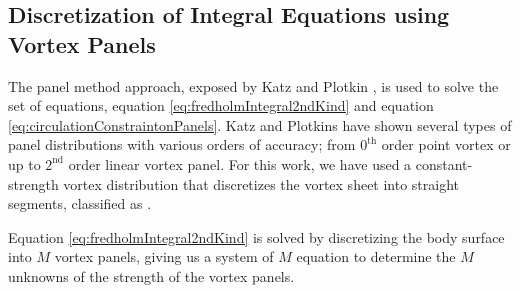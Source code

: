 \subsection{Discretization of Integral Equations using Vortex Panels}

The panel method approach, exposed by Katz and Plotkin \cite{Katz2001a}, is used to solve the set of equations, equation \ref{eq:fredholmIntegral2ndKind} and equation \ref{eq:circulationConstraintonPanels}. Katz and Plotkins have shown several types of panel distributions with various orders of accuracy; from $0^{\mathrm{th}}$ order point vortex or up to $2^{\mathrm{nd}}$ order linear vortex panel. For this work, we have used a constant-strength vortex distribution that discretizes the vortex sheet into straight segments, classified as .


Equation \ref{eq:fredholmIntegral2ndKind} is solved by discretizing the body surface into $M$ vortex panels, giving us a system of $M$ equation to determine the $M$ unknowns of the strength of the vortex panels.



